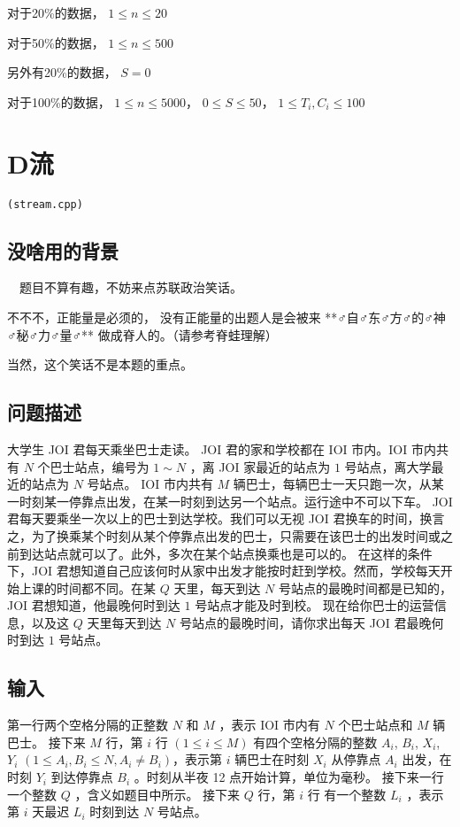 \documentclass[UTF8]{ctexart}
\begin{document}
对于20\%的数据， $1\le n\le 20$

对于50\%的数据， $1\le n\le 500$

另外有20\%的数据， $S=0$

对于100\%的数据， $1\le n\le 5000$， $0\le S\le 50$， $1\le T_i,C_i\le 100$

\newpage
\section{D流}
\begin{center}
\tt\large{(stream.cpp)}
\end{center}

\subsection{没啥用的背景}

~~题目不算有趣，不妨来点苏联政治笑话。~~

不不不，正能量是必须的， 没有正能量的出题人是会被来 **♂自♂东♂方♂的♂神♂秘♂力♂量♂** 做成脊人的。（请参考脊蛙理解）

当然，这个笑话不是本题的重点。

\subsection{问题描述}

大学生 JOI 君每天乘坐巴士走读。
JOI 君的家和学校都在 IOI 市内。IOI 市内共有 $N$ 个巴士站点，编号为 $1\sim N$ ，离 JOI 家最近的站点为 $1$ 号站点，离大学最近的站点为 $N$ 号站点。
IOI 市内共有 $M$ 辆巴士，每辆巴士一天只跑一次，从某一时刻某一停靠点出发，在某一时刻到达另一个站点。运行途中不可以下车。
JOI 君每天要乘坐一次以上的巴士到达学校。我们可以无视 JOI 君换车的时间，换言之，为了换乘某个时刻从某个停靠点出发的巴士，只需要在该巴士的出发时间或之前到达站点就可以了。此外，多次在某个站点换乘也是可以的。
在这样的条件下，JOI 君想知道自己应该何时从家中出发才能按时赶到学校。然而，学校每天开始上课的时间都不同。在某 $Q$ 天里，每天到达 $N$ 号站点的最晚时间都是已知的，JOI 君想知道，他最晚何时到达 $1$ 号站点才能及时到校。
现在给你巴士的运营信息，以及这 $Q$ 天里每天到达 $N$ 号站点的最晚时间，请你求出每天 JOI 君最晚何时到达 $1$ 号站点。

\subsection{输入}

第一行两个空格分隔的正整数 $N$ 和 $M$ ，表示 IOI 市内有 $N$ 个巴士站点和 $M$ 辆巴士。
接下来 $M$ 行，第 $i$ 行 $(1\le i\le M)$ 有四个空格分隔的整数 $A_i$, $B_i$, $X_i$, $Y_i$ $(1\le A_i,B_i\le N, A_i\neq B_i)$，表示第 $i$ 辆巴士在时刻 $X_i$ 从停靠点 $A_i$ 出发，在时刻 $Y_i$ 到达停靠点 $B_i$ 。时刻从半夜 12 点开始计算，单位为毫秒。
接下来一行一个整数 $Q$ ，含义如题目中所示。
接下来 $Q$ 行，第 $i$ 行  有一个整数 $L_i$ ，表示第 $i$ 天最迟 $L_i$ 时刻到达 $N$ 号站点。
\end{document}
